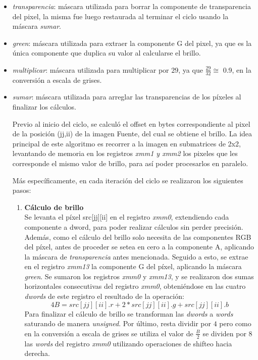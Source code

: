 \documentclass[a4paper]{article}
\begin{document}
\begin{itemize}
	\item \textit{transparencia}: máscara utilizada para borrar la componente de transparencia del pixel, la misma fue luego restaurada al terminar el ciclo usando la máscara \textit{sumar}.
	\item \textit{green}: máscara utilizada para extraer la componente G del pixel, ya que es la única componente que duplica su valor al calcularse el brillo.
	\item \textit{multiplicar}: máscara utilizada para multiplicar por $29$, ya que $\frac{29}{32} \cong $ 0.9, en la conversión a escala de grises.
	\item \textit{sumar}: máscara utilizada para arreglar las transparencias de los píxeles al finalizar los cálculos.
	
 Previo al inicio del ciclo, se calculó el offset en bytes correspondiente al pixel de la posición (jj,ii) de la imagen Fuente, del cual se obtiene el brillo. La idea principal de este algoritmo es recorrer a la imagen en submatrices de 2x2, levantando de memoria en los registros \textit{xmm1 y xmm2}  los pixeles que les corresponde el mismo valor de brillo, para así poder procesarlos en paralelo.
 
 
 Más específicamente, en cada iteración del ciclo se realizaron los siguientes pasos:
 
 \begin{enumerate}
 	\item \textbf{Cálculo de brillo}\\
 	Se levanta el píxel src[jj][ii] en el registro \textit{xmm0}, extendiendo cada componente a dword, para poder realizar cálculos sin perder precisión. Además, como el cálculo del  brillo solo necesita de las componentes RGB del píxel, antes de proceder se setea en cero a la componente A, aplicando la máscara de \textit{transparencia} antes mencionada. Seguido a esto, se extrae en el registro \textit{xmm13} la componente G del píxel, aplicando la máscara \textit{green}. Se sumaron los registros \textit{xmm0} y \textit{xmm13}, y se realizaron dos sumas horizontales consecutivas del registro \textit{xmm0}, obteniéndose en las cuatro \textit{dwords} de este registro el resultado de la operación:
 	\begin{equation}
 	4B = src[jj][ii].r + 2 * src[jj][ii].g + src[jj][ii].b 
 	\end{equation}
 	Para finalizar el cálculo de brillo se transforman las \textit{dwords} a \textit{words} saturando de manera \textit{unsigned}. Por último, resta dividir por $4$ pero como en la conversión a escala de grises se utiliza el valor de $\frac{B}{2}$ se dividen por $8$ las \textit{words} del registro \textit{xmm0} utilizando operaciones de shifteo hacia derecha.
 	

\end{enumerate}
\end{itemize}
\end{document}
